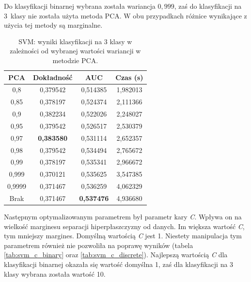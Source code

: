 \documentclass[a4paper, twoside, 11pt, openright]{article}
\begin{document}
Do klasyfikacji binarnej wybrana została wariancja $0,999$, zaś do klasyfikacji na 3~klasy nie została użyta metoda PCA. W obu przypadkach różnice wynikające z użycia tej metody są marginalne.

\begin{table}[H]
    \centering
    \begin{tabular}{|c|c|c|c|}
    \hline
        \textbf{PCA} & \textbf{Dokładność} &  \textbf{AUC} &  \textbf{Czas (s)} \\ \hline
0,8                &  0,379542 &  0,514385 &    1,982013 \\ \hline
0,85               &  0,378197 &  0,524374 &    2,111366 \\ \hline
0,9                &  0,382234 &  0,522026 &    2,248027 \\ \hline
0,95               &  0,379542 &  0,526517 &    2,530379 \\ \hline
0,97               &  \textbf{0,383580} &  0,531114 &    2,652357 \\ \hline
0,98               &  0,379542 &  0,534494 &    2,765672 \\ \hline
0,99               &  0,378197 &  0,535341 &    2,966672 \\ \hline
0,999			   &  0,370121 &  0,535625 &    3,547385 \\ \hline
0,9999             &  0,371467 &  0,536259 &    4,062329 \\ \hline
Brak                &  0,371467 &  \textbf{0,537476} &    4,936680 \\ \hline
    \end{tabular}
    \caption{SVM: wyniki klasyfikacji na 3 klasy w zależności od wybranej wartości wariancji w metodzie PCA.}
    \label{tab:svm_pca_discrete}
\end{table}


Następnym optymalizowanym parametrem był parametr kary \textit{C}. Wpływa on na wielkość marginesu separacji hiperpłaszczyzny od danych. Im większa wartość \textit{C}, tym mniejszy margines. Domyślną wartością \textit{C} jest 1. Niestety manipulacja tym parametrem również nie pozwoliła na poprawę wyników (tabela \ref{tab:svm_c_binary} oraz \ref{tab:svm_c_discrete}). Najlepszą wartością \textit{C} dla klasyfikacji binarnej okazała się wartość domyślna 1, zaś dla klasyfikacji na 3 klasy wybrana została wartość 10. 
\end{document}
